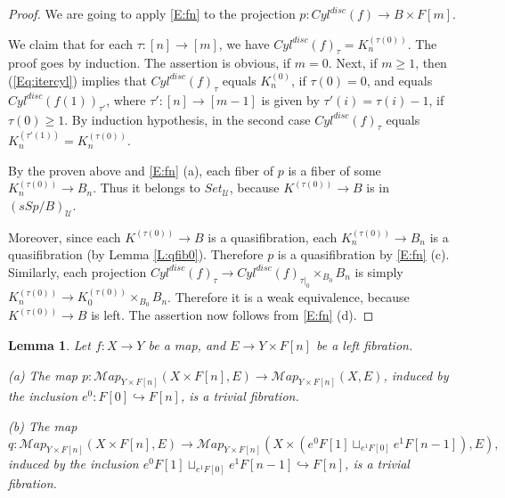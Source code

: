 \documentclass[12pt]{amsart}
\theoremstyle{plain}
\newtheorem{Lem}[Thm]{Lemma}
\theoremstyle{definition}
\numberwithin{equation}{section}
\newcommand{\cal}[1]{\mathcal{#1}}
\newcommand{\C}[1]{\cal#1}
\newcommand{\form}[1]{(\ref{Eq:#1})}
\newcommand{\hra}{\hookrightarrow}
\newcommand{\rl}[1]{Lemma \ref{L:#1}}
\newcommand{\re}[1]{\ref{E:#1}}
\begin{document}
\begin{proof}
We are going to apply \re{fn} to the  projection $p:Cyl^{disc}(f)\to
B\times F[m]$.

We claim that for each $\tau:[n]\to[m]$, we have
$Cyl^{disc}(f)_{\tau}=K^{(\tau(0))}_{n}$. The proof goes by
induction. The assertion is obvious, if $m=0$. Next, if $m\geq 1$,
then \form{itercyl} implies that $Cyl^{disc}(f)_{\tau}$ equals
$K^{(0)}_n$, if $\tau(0)=0$, and equals $Cyl^{disc}(f(1))_{\tau'}$,
where $\tau':[n]\to [m-1]$ is given by $\tau'(i)=\tau(i)-1$, if
$\tau(0)\geq 1$. By induction hypothesis, in the second case
$Cyl^{disc}(f)_{\tau}$ equals
$K^{(\tau'(1))}_{n}=K^{(\tau(0))}_{n}$.

By the proven above and \re{fn} (a), each fiber of
$p$ is a fiber of some
$K^{(\tau(0))}_{n}\to B_n$. Thus it belongs to $Set_{\C{U}}$, because
$K^{(\tau(0))}\to B$ is in $(sSp/B)_{\C{U}}$.

Moreover, since each $K^{(\tau(0))}\to B$ is a quasifibration,
each $K^{(\tau(0))}_n\to B_n$ is a quasifibration (by \rl{qfib0}).
Therefore $p$ is a quasifibration by \re{fn} (c). Similarly, each projection
$Cyl^{disc}(f)_{\tau}\to Cyl^{disc}(f)_{\tau|_0}\times_{B_0}B_n$
is simply $K^{(\tau(0))}_n\to K_0^{(\tau(0))}\times_{B_0}B_n$.
Therefore it is a weak equivalence, because $K^{(\tau(0))}\to B$
is left. The assertion now follows from  \re{fn}
(d).
\end{proof}

\begin{Lem} \label{L:lfibr}
Let $f:X\to Y$ be a map, and $E\to Y\times F[n]$ be a left
fibration.

(a) The map $p:\C{Map}_{Y\times F[n]}(X\times F[n],E)\to
\C{Map}_{Y\times F[n]}(X,E)$, induced by the inclusion
$e^0:F[0]\hra F[n]$, is a trivial fibration.

(b) The map
\[
q:\C{Map}_{Y\times F[n]}(X\times F[n],E)\to \C{Map}_{Y\times
F[n]}(X\times (e^0 F[1]\sqcup_{e^1 F[0]} e^1 F[n-1]),E), \]
induced by the inclusion $e^0F[1]\sqcup_{e^1 F[0]}e^1 F[n-1]\hra
F[n]$, is a trivial fibration.
\end{Lem}
\end{document}
